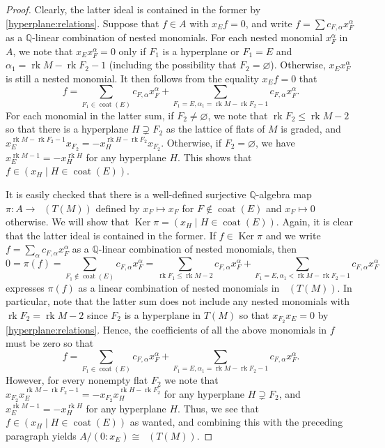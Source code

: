 \documentclass[11pt, reqno]{amsart}
\DeclareMathOperator{\Chow}{\underline{CH}}		%
\DeclareMathOperator{\coat}{coat}
\renewcommand{\emptyset}{\varnothing}
\newcommand{\iso}{\cong}
\DeclareMathOperator{\Ker}{Ker}
\renewcommand{\ker}{\Ker}
\newcommand{\QQ}{\mathbb{Q}}
\DeclareMathOperator{\rk}{rk}
\theoremstyle{definition}
\numberwithin{equation}{section}
\numberwithin{table}{section}
\begin{document}
\begin{spacing}{1.1}
\begin{proof}
Clearly, the latter ideal is contained in the former by \eqref{hyperplane:relations}.  Suppose that $f \in A$ with $x_Ef = 0$, and write $f = \sum c_{F, \alpha} x_F^\alpha$ as a $\QQ$-linear combination of nested monomials.  For each nested monomial $x_F^\alpha$ in $A$, we note that $x_Ex_F^\alpha = 0$ only if $F_1$ is a hyperplane or $F_1 = E$ and $\alpha_1 = \rk M - \rk F_2 - 1$ (including the possibility that $F_2 = \emptyset$).  Otherwise, $x_Ex_F^\alpha$ is still a nested monomial.  It then follows from the equality $x_Ef = 0$ that 
\[ 
f = \sum_{F_1 \in \coat(E)} c_{F, \alpha} x_F^\alpha + \sum_{F_1 = E, \alpha_1 = \rk M - \rk F_2 - 1} c_{F, \alpha}x^\alpha_F.  
\]
For each monomial in the latter sum, if $F_2 \neq \emptyset$, we note that $\rk F_2 \leq \rk M - 2$ so that there is a hyperplane $H \supsetneq F_2$ as the lattice of flats of $M$ is graded, and $x_E^{\rk M - \rk F_2 - 1}x_{F_2} = -x_H^{\rk H - \rk F_2}x_{F_2}$.  Otherwise, if $F_2 = \emptyset$, we have $x_E^{\rk M - 1} = -x_H^{\rk H}$ for any hyperplane $H$.  This shows that $f \in (x_H \mid H \in \coat(E))$.

It is easily checked that there is a well-defined surjective $\QQ$-algebra map $\pi: A \to \Chow(T(M))$ defined by $x_F \mapsto x_F$ for $F \notin \coat(E)$ and $x_F \mapsto 0$ otherwise.  We will show that $\ker \pi = (x_H \mid H \in \coat(E))$.  Again, it is clear that the latter ideal is contained in the former.  If $f \in \ker \pi$ and we write $f = \sum_\alpha c_{F, \alpha}x_F^\alpha$ as a $\QQ$-linear combination of nested monomials, then 
\[
0 = \pi(f) = \sum_{F_1 \notin \coat(E)} c_{F, \alpha} x_F^\alpha = \sum_{\rk F_1 \leq \rk M -2} c_{F, \alpha} x_F^\alpha + \sum_{F_1 = E, \alpha_1 < \rk M - \rk F_2 - 1} c_{F, \alpha} x_F^\alpha 
\]
expresses $\pi(f)$ as a linear combination of nested monomials in $\Chow(T(M))$.  In particular, note that the latter sum does not include any nested monomials with $\rk F_2 = \rk M - 2$ since $F_2$ is a hyperplane in $T(M)$ so that $x_{F_2}x_E = 0$ by \eqref{hyperplane:relations}.  Hence, the coefficients of all the above monomials in $f$ must be zero so that 
\[
f = \sum_{F_1 \in \coat(E)} c_{F, \alpha} x_F^\alpha +  \sum_{F_1 = E, \alpha_1 =  \rk M - \rk F_2 -1} c_{F, \alpha} x_F^\alpha. 
\]
However, for every nonempty flat $F_2$ we note that $x_{F_2}x_E^{\rk M - \rk F_2 - 1} = -x_{F_2}x_H^{\rk H - \rk F_2}$ for any hyperplane $H \supsetneq F_2$, and $x_E^{\rk M -1} = -x_H^{\rk H}$ for any hyperplane $H$.  Thus, we see that $f \in (x_H \mid H \in \coat(E))$ as wanted, and combining this with the preceding paragraph yields $A/(0 : x_E) \iso \Chow(T(M))$.
\end{proof}


\end{spacing}
\end{document}
